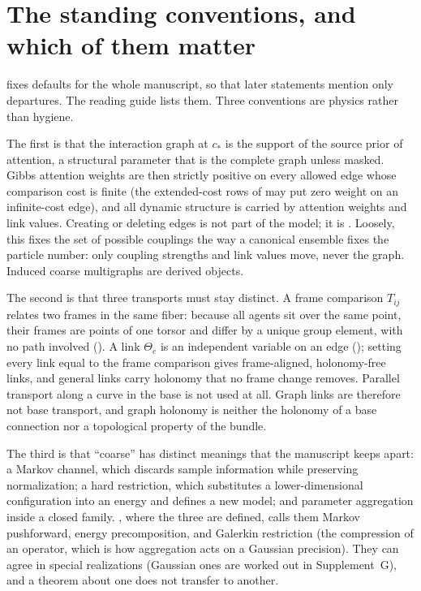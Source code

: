 \section{The standing conventions, and which of them matter}
\label{comp:ch01-conventions}

 fixes defaults for the whole manuscript, so that later statements mention
only departures. The reading guide lists them. Three conventions are physics rather than hygiene.

The first is that the interaction graph at $c_*$ is the support of the source prior of attention, a
structural parameter that is the complete graph unless masked. Gibbs attention weights are then
strictly positive on every allowed edge whose comparison cost is finite (the extended-cost rows of
 may put zero weight on an infinite-cost edge), and all dynamic structure
is carried by attention weights and link values. Creating or deleting edges is not part of the model;
it is . Loosely, this fixes the set of possible couplings the way a
canonical ensemble fixes the particle number: only coupling strengths and link values move, never
the graph. Induced coarse multigraphs are derived objects.

The second is that three transports must stay distinct. A frame comparison $T_{ij}$ relates two frames
in the same fiber: because all agents sit over the same point, their frames are points of one torsor
and differ by a unique group element, with no path involved (). A link
$\Theta_e$ is an independent variable on an edge (); setting every link equal to
the frame comparison gives frame-aligned, holonomy-free links, and general links carry holonomy that no
frame change removes. Parallel transport along a curve in the base is not used at all. Graph links are
therefore not base transport, and graph holonomy is neither the holonomy of a base connection nor a
topological property of the bundle.

The third is that ``coarse'' has distinct meanings that the manuscript keeps apart: a Markov channel,
which discards sample information while preserving normalization; a hard restriction, which
substitutes a lower-dimensional configuration into an energy and defines a new model; and parameter
aggregation inside a closed family. , where the three are defined, calls
them Markov pushforward, energy precomposition, and Galerkin restriction (the compression of an
operator, which is how aggregation acts on a Gaussian precision). They can agree in special
realizations (Gaussian ones are worked out in Supplement~G), and a theorem about one does not
transfer to another.


